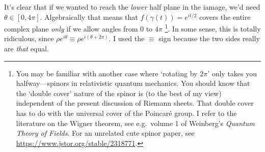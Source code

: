 It's clear that if we wanted to reach the \emph{lower} half plane in the iamage, we'd need $\theta \in [0, 4\pi]$. Algebraically that means that $f(\gamma(t)) = e^{it/2}$ covers the entire complex plane \emph{only} if we allow angles from 0 to $4\pi$
\footnote{You may be familiar with another case where `rotating by $2\pi$' only takes you halfway---spinors in relativistic quantum mechanics. You should know that the `double cover' nature of the spinor is (to the best of my view) independent of the present discussion of Riemann sheets. That double cover has to do with the universal cover of the Poincar\'e group. I refer to the literature on the Wigner theorem, see e.g.\ volume 1 of Weinberg's \emph{Quantum Theory of Fields}. For an unrelated cute spinor paper, see \url{https://www.jstor.org/stable/2318771}.}. In some sense, this is totally ridiculous, since $\rho e^{i\theta} \equiv \rho e^{i(\theta+2\pi)}$. I used the $\equiv$ sign because the two sides really are \emph{that} equal.


